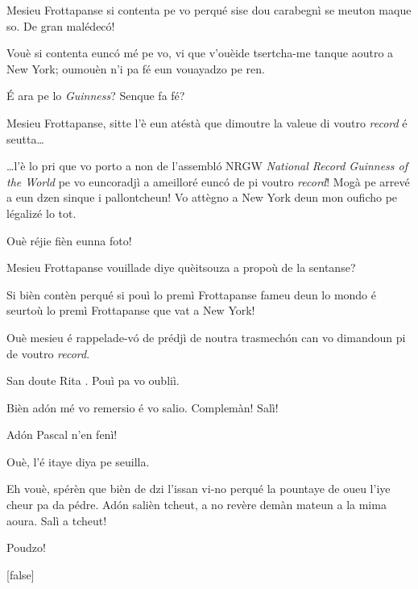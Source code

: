 \begin{drama}
\Ritaspeaks Mesieu Frottapanse si contenta pe vo perqué sise dou carabegnì se meuton maque so. De gran malédec\'o!

\Tissotspeaks Vouè si contenta eunc\'o mé pe vo, vi que v'ouèide tsertcha-me tanque aoutro a New York; oumouèn n’i pa fé eun vouayadzo pe ren.

\Cienspeaks É ara pe lo \textit{Guinness}? Senque fa fé?

\Tissotspeaks Mesieu Frottapanse, sitte l’è eun atéstà que dimoutre la valeue di voutro \textit{record} é seutta\ldots


\Tissotspeaks \ldots l’è lo pri que vo porto a non de l’assembló NRGW \textit{National Record Guinness of the World} pe vo euncoradjì a ame\-illo\-ré eunc\'o de pi voutro \textit{record}!  Mogà pe arrevé a eun dzen sinque i pallontcheun! Vo attègno a New York deun mon ouficho pe légalizé lo tot.

\Ritaspeaks Ouè réjie fièn eunna foto!


\Ritaspeaks Mesieu Frottapanse vouillade diye quèitsouza a propoù de la sentanse?

\Cienspeaks Si bièn contèn perqué si pouì lo premì Frottapanse fameu deun lo mondo é seurtoù lo premì Frottapanse que vat a New York!

\Ritaspeaks Ouè mesieu é rappelade-v\'o de prédjì de noutra trasmechón can vo dimandoun pi de voutro \textit{record}.

\Cienspeaks San doute Rita \ok. Pouì pa vo oubliì.

\Ritaspeaks  Bièn ad\'on mé vo remersio é vo salio. Complemàn! Salì!


\Ritaspeaks Adón Pascal n'en fenì!

\Pascalspeaks Ouè, l’é itaye diya pe seuilla.

\Ritaspeaks Eh vouè, spérèn que bièn de dzi l’issan vi-no perqué la pountaye de oueu l’iye cheur pa da pédre. Adón salièn tcheut, a no revère demàn mateun a la mima aoura. Salì a tcheut!

\Pascalspeaks Poudzo!

[false]

\ridocliou

\DeriLeRido


\end{drama}
